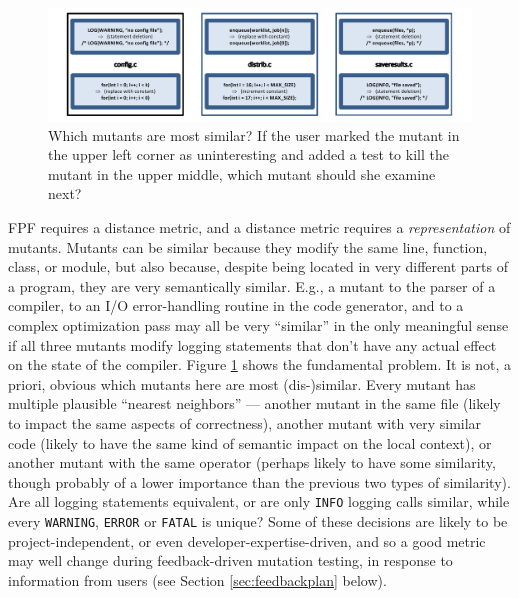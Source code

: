 \begin{figure}[t]
\centering
\includegraphics[width=0.95\columnwidth]{distmetric}

\caption{Which mutants are most similar?  If the user marked the
  mutant in the upper left corner as uninteresting and added a test
  to kill the
  mutant in the upper middle, which mutant
  should she examine next?}
\label{fig:distances}
\end{figure}


FPF requires a distance metric, and a distance metric requires a
\emph{representation} of mutants.  Mutants can be similar because they
modify the same line, function, class, or module, but also because,
despite being located in very different parts of a program, they are
very semantically similar.  E.g., a mutant to the parser of a compiler, to
an I/O error-handling routine in the code generator, and to a complex
optimization pass may all be very ``similar'' in the only meaningful
sense if all three mutants modify logging statements that don't have
any actual effect on the state of the compiler.  Figure
\ref{fig:distances} shows the fundamental problem.  It is not,
a priori, obvious which mutants here are most (dis-)similar.  Every
mutant has multiple plausible ``nearest neighbors'' --- another mutant
in the same file (likely to impact the same aspects of correctness),
another mutant with very similar code (likely to have the same kind of
semantic impact on the local context), or another mutant with the same operator (perhaps
likely to have some similarity, though probably of a lower importance
than the previous two types of similarity).  Are all logging statements
equivalent, or are only {\tt INFO} logging calls similar, while every
{\tt WARNING}, {\tt ERROR} or {\tt FATAL} is unique?  Some of these
decisions are likely to be project-independent, or even
developer-expertise-driven, and so a good metric
may well change during feedback-driven mutation testing, in response
to information from users (see Section \ref{sec:feedbackplan} below).

